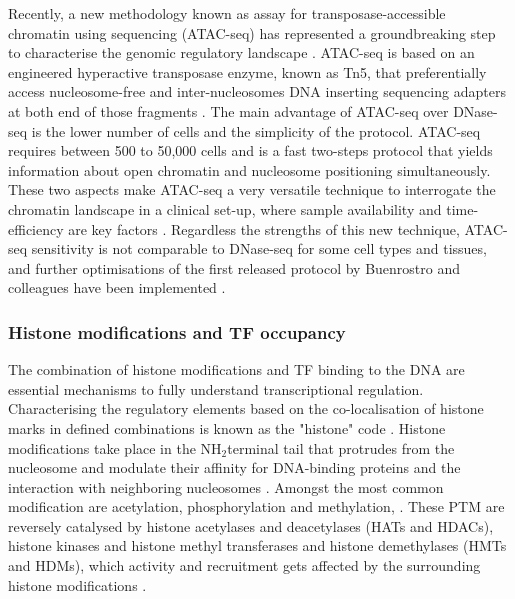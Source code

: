 Recently, a new methodology known as assay for transposase-accessible chromatin using sequencing (ATAC-seq) has represented a groundbreaking step to characterise the genomic regulatory landscape \parencite{Buenrostro2013}. ATAC-seq is based on an engineered hyperactive transposase enzyme, known as Tn5, that preferentially access nucleosome-free and inter-nucleosomes DNA inserting sequencing adapters at both end of those fragments \parencite{Gradman2008, Adey2010}. The main advantage of ATAC-seq over DNase-seq is the lower number of cells and the simplicity of the protocol. ATAC-seq requires between 500 to 50,000 cells and is a fast two-steps protocol that yields information about open chromatin and nucleosome positioning simultaneously. These two aspects make ATAC-seq a very versatile technique to interrogate the chromatin landscape in a clinical set-up, where sample availability and time-efficiency are key factors \parencite{Scharer2016,Qu2015,Qu2017}. Regardless the strengths of this new technique, ATAC-seq sensitivity is not comparable to DNase-seq for some cell types and tissues, and further optimisations of the first released protocol by Buenrostro and colleagues have been implemented \parencite{Corces2016,Sos2016,Corces2017}. 

\subsubsection{Histone modifications and TF occupancy}

The combination of histone modifications and TF binding to the DNA are essential mechanisms to fully understand transcriptional regulation. Characterising the regulatory elements based on the co-localisation of histone marks in defined combinations is known as the "histone" code \parencite{Jenuwein2001}. Histone modifications take place in the NH$_2$terminal tail that protrudes from the nucleosome and modulate their affinity for DNA-binding proteins and the interaction with neighboring nucleosomes \parencite{Bannister2011}. Amongst the most common modification are acetylation, phosphorylation and methylation, 
\parencite{Bayarsaihan2011}. These PTM are reversely catalysed by histone acetylases and deacetylases (HATs and HDACs), histone kinases and histone methyl transferases and histone demethylases (HMTs and HDMs), which activity and recruitment gets affected by the surrounding histone modifications \parencite{Bannister2011,Shi2006,Nelson2006}. 

